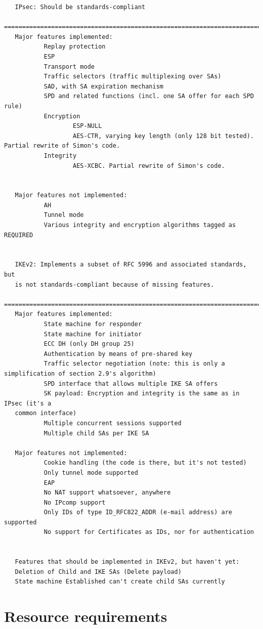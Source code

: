 \documentclass[final,a4paper,twoside,11pt,onecolumn]{report}
\begin{document}
\begin{verbatim}
   IPsec: Should be standards-compliant
   =============================================================================================
   Major features implemented:
           Replay protection
           ESP
           Transport mode
           Traffic selectors (traffic multiplexing over SAs)
           SAD, with SA expiration mechanism
           SPD and related functions (incl. one SA offer for each SPD rule)
           Encryption
                   ESP-NULL
                   AES-CTR, varying key length (only 128 bit tested). Partial rewrite of Simon's code.
           Integrity
                   AES-XCBC. Partial rewrite of Simon's code.


   Major features not implemented:
           AH
           Tunnel mode
           Various integrity and encryption algorithms tagged as REQUIRED


   IKEv2: Implements a subset of RFC 5996 and associated standards, but
   is not standards-compliant because of missing features.
   =============================================================================================
   Major features implemented:
           State machine for responder
           State machine for initiator
           ECC DH (only DH group 25)
           Authentication by means of pre-shared key
           Traffic selector negotiation (note: this is only a simplification of section 2.9's algorithm)
           SPD interface that allows multiple IKE SA offers
           SK payload: Encryption and integrity is the same as in IPsec (it's a
   common interface)
           Multiple concurrent sessions supported
           Multiple child SAs per IKE SA

   Major features not implemented:
           Cookie handling (the code is there, but it's not tested)
           Only tunnel mode supported
           EAP
           No NAT support whatsoever, anywhere
           No IPcomp support
           Only IDs of type ID_RFC822_ADDR (e-mail address) are supported
           No support for Certificates as IDs, nor for authentication


   Features that should be implemented in IKEv2, but haven't yet:
   Deletion of Child and IKE SAs (Delete payload)
   State machine Established can't create child SAs currently
\end{verbatim}

\section{Resource requirements}
\end{document}
